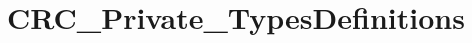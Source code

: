 \hypertarget{group___c_r_c___private___types_definitions}{\section{C\-R\-C\-\_\-\-Private\-\_\-\-Types\-Definitions}
\label{group___c_r_c___private___types_definitions}
}
